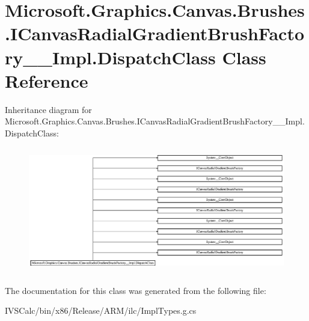 \hypertarget{class_microsoft_1_1_graphics_1_1_canvas_1_1_brushes_1_1_i_canvas_radial_gradient_brush_factory_____impl_1_1_dispatch_class}{}\section{Microsoft.\+Graphics.\+Canvas.\+Brushes.\+I\+Canvas\+Radial\+Gradient\+Brush\+Factory\+\_\+\+\_\+\+Impl.\+Dispatch\+Class Class Reference}
\label{class_microsoft_1_1_graphics_1_1_canvas_1_1_brushes_1_1_i_canvas_radial_gradient_brush_factory_____impl_1_1_dispatch_class}
Inheritance diagram for Microsoft.\+Graphics.\+Canvas.\+Brushes.\+I\+Canvas\+Radial\+Gradient\+Brush\+Factory\+\_\+\+\_\+\+Impl.\+Dispatch\+Class\+:\begin{figure}[H]
\begin{center}
\leavevmode
\includegraphics[height=5.549550cm]{class_microsoft_1_1_graphics_1_1_canvas_1_1_brushes_1_1_i_canvas_radial_gradient_brush_factory_____impl_1_1_dispatch_class}
\end{center}
\end{figure}


The documentation for this class was generated from the following file\+:\begin{DoxyCompactItemize}
\item 
I\+V\+S\+Calc/bin/x86/\+Release/\+A\+R\+M/ilc/Impl\+Types.\+g.\+cs\end{DoxyCompactItemize}
